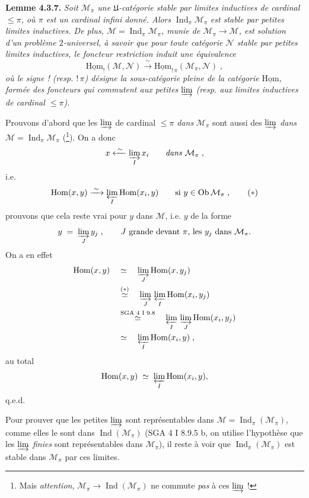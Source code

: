 \documentclass[11pt]{article}
\newcommand{\printedpage}[1]{\if\relax\detokenize{#1}\relax\else\marginpar{\footnotesize p.~#1}\fi}
\newcommand{\msp}[1]{\marginpar{\footnotesize [#1]}}
\newcommand{\uHom}{\underline{\mathrm{Hom}}}
\newcommand{\Hom}{\mathrm{Hom}}
\newcommand{\Ob}{\mathrm{Ob}\,}
\newcommand{\Ind}{\operatorname{Ind}}
\begin{document}
\textbf{Lemme 4.3.7.} \textit{Soit $\mathcal{M}_\pi$ une $\mathfrak{U}$-catégorie stable par limites inductives de cardinal $\leqslant \pi$, où $\pi$ est un cardinal infini donné. Alors} $\Ind_\pi\mathcal{M}_\pi$ \textit{est stable par petites limites inductives. De plus, $\mathcal{M} = \Ind_\pi\mathcal{M}_\pi$, munie de $\mathcal{M}_\pi \longrightarrow \mathcal{M}$, est solution d'un problème $2$-universel, à savoir
\printedpage{15}
que pour toute catégorie $\mathcal{N}$ stable par petites limites inductives, le foncteur restriction induit une équivalence}
\[
\uHom_{!}(\mathcal{M},\mathcal{N}) \xrightarrow{\;\sim\;} \uHom_{!\,\pi}(\mathcal{M}_\pi,\mathcal{N}) \;, \tag*{(4.3.7.1)}
\]
\textit{où le signe ! (resp. $!\,\pi$) désigne la sous-catégorie pleine de la catégorie} $\uHom$\textit{, formée des foncteurs qui commutent aux petites} $\varinjlim$ \textit{(resp. aux limites inductives de cardinal $\leqslant \pi$).}

\msp{page 78}
Prouvons d'abord que les $\varinjlim$ de cardinal $\leqslant \pi$ \textit{dans} $\mathcal{M}_\pi$ sont aussi des $\varinjlim$ \textit{dans} $\mathcal{M} = \Ind_\pi\mathcal{M}_\pi$ (\footnote{Mais \textit{attention}, $\mathcal{M}_\pi \longrightarrow \Ind(\mathcal{M}_\pi)$ ne commute \textit{pas} à ces $\varinjlim$ !}). On a donc
\[
x \xleftarrow{\;\sim\;} \varinjlim_{I} x_i \qquad \textit{dans } \mathcal{M}_\pi \;,
\]
i.e.
\[
\Hom(x,y) \xrightarrow{\;\sim\;} \varprojlim_{I} \Hom(x_i,y) \qquad \text{si } y \in \Ob\mathcal{M}_\pi \;, \tag*{$(*)$}
\]
prouvons que cela reste vrai pour $y$ dans $\mathcal{M}$, i.e. $y$ de la forme
\[
y \;=\; \varinjlim_{J} y_j \;, \qquad J \text{ grande devant } \pi\text{, les } y_j \text{ dans } \mathcal{M}_\pi.
\]
On a en effet
\[
\begin{aligned}
\Hom(x,y) \quad &\simeq \quad \varinjlim_{J} \Hom(x,y_j)\\
&\overset{(*)}{\simeq} \quad \varinjlim_{J}\, \varprojlim_{I} \Hom(x_i,y_j)\\
&\overset{\text{SGA 4 I 9.8}}{\simeq} \quad \varprojlim_{I}\, \varinjlim_{J} \Hom(x_i,y_j)\\
&\simeq \quad \varprojlim_{I} \Hom(x_i,y) \;,
\end{aligned}
\]
au total
\[
\Hom(x,y) \;\simeq\; \varprojlim_{I} \Hom(x_i,y),
\]
q.e.d.

Pour prouver que les petites $\varinjlim$ sont représentables dans $\mathcal{M} = \Ind_\pi(\mathcal{M}_\pi)$, comme elles le sont dans $\Ind(\mathcal{M}_\pi)$ (SGA 4 I 8.9.5 b, on utilise l'hypothèse que les $\varinjlim$ \textit{finies} sont représentables dans $\mathcal{M}_\pi$), il reste à voir que $\Ind_\pi(\mathcal{M}_\pi)$ est stable dans $\mathcal{M}_\pi$ par ces limites.
\end{document}
